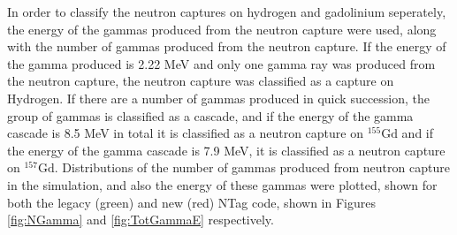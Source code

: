 In order to classify the neutron captures on hydrogen and gadolinium seperately, the energy of the gammas produced from the neutron capture were used, along with the number of gammas produced from the neutron capture. If the energy of the gamma produced is 2.22 MeV and only one gamma ray was produced from the neutron capture, the neutron capture was classified as a capture on Hydrogen. If there are a number of gammas produced in quick succession, the group of gammas is classified as a cascade, and if the energy of the gamma cascade is 8.5 MeV in total it is classified as a neutron capture on  ${ }^{155} \mathrm{Gd}$ and if the energy of the gamma cascade is 7.9 MeV, it is classified as a neutron capture on ${ }^{157} \mathrm{Gd}$. Distributions of the number of gammas produced from neutron capture in the simulation, and also the energy of these gammas were plotted, shown for both the legacy (green) and new (red) NTag code, shown in Figures \ref{fig:NGamma} and \ref{fig:TotGammaE} respectively. 

